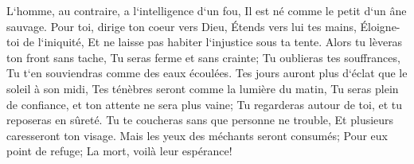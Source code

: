 \verse L`homme, au contraire, a l`intelligence d`un fou, Il est né comme le petit d`un âne sauvage. 
\verse Pour toi, dirige ton coeur vers Dieu, Étends vers lui tes mains, 
\verse Éloigne-toi de l`iniquité, Et ne laisse pas habiter l`injustice sous ta tente. 
\verse Alors tu lèveras ton front sans tache, Tu seras ferme et sans crainte; 
\verse Tu oublieras tes souffrances, Tu t`en souviendras comme des eaux écoulées. 
\verse Tes jours auront plus d`éclat que le soleil à son midi, Tes ténèbres seront comme la lumière du matin, 
\verse Tu seras plein de confiance, et ton attente ne sera plus vaine; Tu regarderas autour de toi, et tu reposeras en sûreté. 
\verse Tu te coucheras sans que personne ne trouble, Et plusieurs caresseront ton visage. 
\verse Mais les yeux des méchants seront consumés; Pour eux point de refuge; La mort, voilà leur espérance! 


